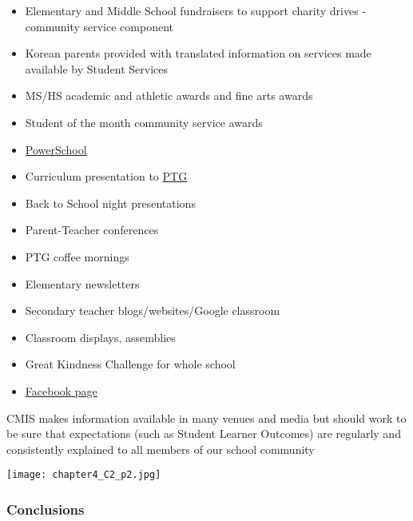 
\begin{findings}
\begin{itemize}
\item Elementary and Middle School fundraisers to support charity drives - community service component
\item Korean parents provided with translated information on services made available by Student Services 
\item MS/HS academic and athletic awards and fine arts awards
\item Student of the month community service awards 
\item \href{https://cmis.powerschool.com/public/}{PowerSchool}
\item Curriculum presentation to \href{http://blogs.cmis.ac.th/ptg/}{PTG}
\item Back to School night presentations
\item Parent-Teacher conferences 
\item PTG coffee mornings
\item Elementary newsletters
\item Secondary teacher blogs/websites/Google classroom
\item Classroom displays, assemblies
\item Great Kindness Challenge for whole school
\item \href{https://www.facebook.com/cmis.th/}{Facebook page}
\end{itemize}


CMIS makes information available in many venues and media but should work to be sure that expectations (such as Student Learner Outcomes) are regularly and consistently explained to all members of our school community
\end{findings}

{\centering\texttt{[image: chapter4\_C2\_p2.jpg]}}

\subsubsection{Conclusions}

